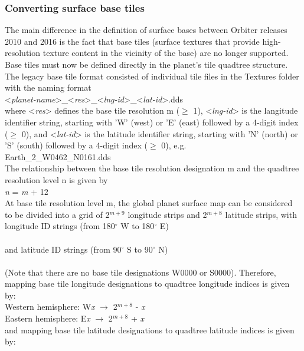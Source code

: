 \documentclass[Orbiter Developer Manual.tex]{subfiles}
\begin{document}
\subsubsection{Converting surface base tiles}
The main difference in the definition of surface bases between Orbiter releases 2010 and 2016 is the fact that base tiles (surface textures that provide high-resolution texture content in the vicinity of the base) are no longer supported. Base tiles must now be defined directly in the planet's tile quadtree structure.\\
The legacy base tile format consisted of individual tile files in the Textures folder with the naming format\\
\indent <\textit{planet-name}>\_<\textit{res}>\_<\textit{lng-id}>\_<\textit{lat-id}>.dds\\
where <\textit{res}> defines the base tile resolution m ($\geq$ 1), <\textit{lng-id}> is the langitude identifier string, starting with 'W' (west) or 'E' (east) followed by a 4-digit index ($\geq$ 0), and <\textit{lat-id}> is the latitude identifier string, starting with 'N' (north) or 'S' (south) followed by a 4-digit index ($\geq$ 0), e.g.\\
\indent Earth\_2\_W0462\_N0161.dds\\
The relationship between the base tile resolution designation m and the quadtree resolution level n is given by\\
\indent \textit{n} = \textit{m} + 12\\
At base tile resolution level m, the global planet surface map can be considered to be divided into a grid of 2$^{m+9}$ longitude strips and 2$^{m+8}$ latitude strips, with longitude ID strings (from 180$^{\circ}$ W to 180$^{\circ}$ E)\\
\indent [W2$^{m+8}$, ... , W0001, E0000, E2$^{m+8}$-1]\\
and latitude ID strings (from 90$^{\circ}$ S to 90$^{\circ}$ N)\\
\indent [S2$^{m+7}$, ... , S0001, N0000, N2$^{m+7}$-1]\\
(Note that there are no base tile designations W0000 or S0000). Therefore, mapping base tile longitude designations to quadtree longitude indices is given by:\\
\indent Western hemisphere: W\textit{x} $\rightarrow$ 2$^{m+8}$ - \textit{x}\\
\indent Eastern hemisphere: E\textit{x} $\rightarrow$ 2$^{m+8}$ + \textit{x}\\
and mapping base tile latitude designations to quadtree latitude indices is given by:\\
\end{document}
